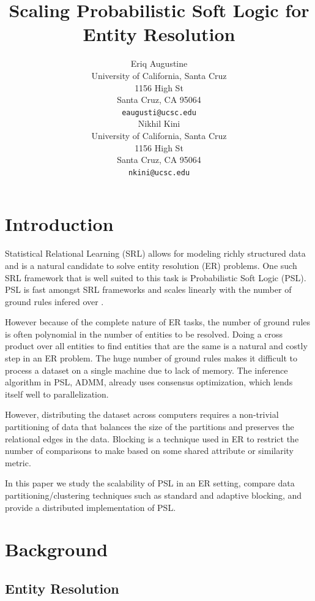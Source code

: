 \documentclass{article}
\title{Scaling Probabilistic Soft Logic for Entity Resolution}
\author{
  Eriq Augustine \\
  University of California, Santa Cruz\\
  1156 High St\\
  Santa Cruz, CA 95064\\
  \texttt{eaugusti@ucsc.edu} \\
\And
 Nikhil Kini \\
 University of California, Santa Cruz\\
 1156 High St\\
 Santa Cruz, CA 95064\\
 \texttt{nkini@ucsc.edu} \\
}
\begin{document}

\maketitle

\section{Introduction}
    Statistical Relational Learning (SRL) allows for modeling richly structured data and is a natural candidate to solve entity resolution (ER) problems.
    One such SRL framework that is well suited to this task is Probabilistic Soft Logic (PSL).
    PSL is fast amongst SRL frameworks and scales linearly with the number of ground rules infered over \cite{bach2015hinge}.
    
    However because of the complete nature of ER tasks, the number of ground rules is often polynomial in the number of entities to be resolved.
    Doing a cross product over all entities to find entities that are the same is a natural and costly step in an ER problem.
    The huge number of ground rules makes it difficult to process a dataset on a single machine due to lack of memory.
    The inference algorithm in PSL, ADMM,  already uses consensus optimization, which lends itself well to parallelization.
    
    However, distributing the dataset across computers requires a non-trivial partitioning of data that balances the size of the partitions and preserves the relational edges in the data.
    Blocking is a technique used in ER to restrict the number of comparisons to make based on some shared attribute or similarity metric.
    
    In this paper we study the scalability of PSL in an ER setting,
    compare data partitioning/clustering techniques such as standard and adaptive blocking,
    and provide a distributed implementation of PSL.

\section{Background}

    \subsection{Entity Resolution}
    
\end{document}
